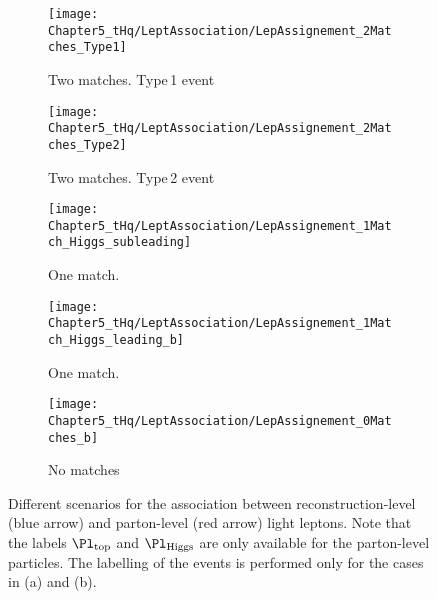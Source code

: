 \begin{figure}[h]
\centering
\begin{subfigure}{.49\textwidth}
  \centering
  \texttt{[image: Chapter5\_tHq/LeptAssociation/LepAssignement\_2Matches\_Type1]}
  \caption{Two matches. Type$\,$1 event}
  \label{fig:chap:tH:LepAssign:Match:Type1}
\end{subfigure} 
\begin{subfigure}{.49\textwidth}
  \centering
  \texttt{[image: Chapter5\_tHq/LeptAssociation/LepAssignement\_2Matches\_Type2]}
  \caption{Two matches. Type$\,$2 event}
  \label{fig:chap:tH:LepAssign:Match:Type2}
\end{subfigure}

\begin{subfigure}{.49\textwidth}
  \centering
  \texttt{[image: Chapter5\_tHq/LeptAssociation/LepAssignement\_1Match\_Higgs\_subleading]}
  \caption{One match.}
  \label{fig:chap:tH:LepAssign:Match:1Match}
\end{subfigure}\hfill
\begin{subfigure}{.49\textwidth}
  \centering
  \texttt{[image: Chapter5\_tHq/LeptAssociation/LepAssignement\_1Match\_Higgs\_leading\_b]}
  \caption{One match.}
  \label{fig:chap:tH:LepAssign:Match:1Match_b}
\end{subfigure}

\begin{subfigure}{.5\textwidth}
  \centering
  \texttt{[image: Chapter5\_tHq/LeptAssociation/LepAssignement\_0Matches\_b]}
  \caption{No matches}
  \label{fig:chap:tH:LepAssign:Match:0Matchs}
\end{subfigure}
\caption{	Different scenarios for the association between reconstruction-level (blue arrow) 
		and parton-level (red arrow) light leptons. 
		Note that the labels $\Pl_{\text{top}}$ and $\Pl_{\text{Higgs}}$ are only available 
		for the parton-level particles. The labelling of the events is performed only for the 
		cases in (a) and (b).}%
\label{fig:chap:tH:LepAssign:Match}
\end{figure}

